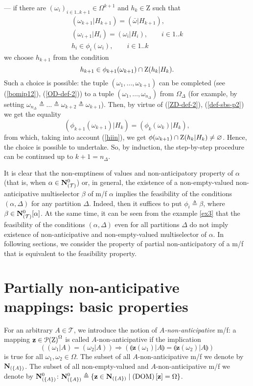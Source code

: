 \documentclass[sn-mathphys,Numbered,pdflatex]{sn-jnl}%
\theoremstyle{thmstyleone}%
\theoremstyle{thmstyletwo}%
\theoremstyle{thmstylethree}%
\newcommand{\nint}[2]{{{#1}..{#2}}}%
\newcommand{\mydef}{\mathrel{\triangleq}}%
\newcommand{\icP}[1]{\EuScript{P}({#1})}%
\newcommand{\res}[2]{\ensuremath{(#1|#2)}}%
\newcommand{\myimp}{\ensuremath{\mathrel{\Rightarrow}}}%
\newcommand{\naOm}{\ensuremath{\Omega}}%
\newcommand{\naZ}{\ensuremath{\mathrm{Z}}}%
\newcommand{\naZo}[2]{\naZ\setbox0=\hbox{\text{$#1$}}\ifdim\wd0=0pt\else\res{#1}{#2}\fi}%
\newcommand{\naTc}{\ensuremath{\mathcal{T}}}%
\newcommand{\naN}{\AnaN{\naTc}{}}%
\newcommand{\AnaN}[2]{\mathbf{N}_{(#1)}\setbox0=\hbox{\text{$#2$}}\ifdim\wd0=0pt\else\left[{#2}\right]\fi}%
\newcommand{\AnaNO}[2]{\mathbf{N}^0_{(#1)}\setbox0=\hbox{\text{$#2$}}\ifdim\wd0=0pt\else\left[{#2}\right]\fi}%
\newcommand{\nado}[1]{(\mathrm{DOM})\setbox0=\hbox{\text{$#1$}}\ifdim\wd0=0pt\else\left[{#1}\right]\fi}%
\newcommand{\naNO}[1]{\naN^0\setbox0=\hbox{\text{$#1$}}\ifdim\wd0=0pt\else[{#1}]\fi}%
\newcommand{\sres}[2]{\llparenthesis#1|#2\rrparenthesis}%
\newcommand{\fref}[1]{{\rm(\ref{#1})}}   %
\begin{document}
--- if there are $(\omega_i)_{i\in\nint1{k+1}}\in\naOm^{k+1}$ and $h_k\in\naZ$ such that
\begin{gather}
\res{\omega_{k+1}}{H_{k+1}}=\res{\bar\omega}{H_{k+1}} ,\label{bomip1}\\
\res{\omega_{i+1}}{H_{i}}=\res{\omega_i}{H_{i}},\qquad i\in\nint1k\label{bomip12}\\
h_i\in\phi_i(\omega_i),\qquad i\in\nint1k\label{hiin}
\end{gather}
we choose $h_{k+1}$ from the condition
$$
h_{k+1}\in\phi_{k+1}(\omega_{k+1})\cap\naZo{h_k}{H_k}.
$$
Such a choice is possible: the tuple $(\omega_1,\ldots,\omega_{k+1})$ can be completed (see \fref{bomip12}, \fref{OD-def-2}) to a tuple $(\omega_1,\ldots,\omega_{n_\Delta})$ from $\naOm_\Delta$ (for example, by setting $\omega_{n_\Delta} \mydef \ldots \mydef \omega_{k+2} \mydef \omega_{k+1}$).
Then, by virtue of \fref{ZD-def-2}, \fref{def-sbs-p2} we get the equality
$$
\res{\phi_{k+1}(\omega_{k+1})}{H_{k}}=\res{\phi_{k}(\omega_{k})}{H_{k}},
$$
from which, taking into account \fref{hiin}, we get $\phi(\omega_{k+1})\cap\naZo{h_k}{H_k}\neq\varnothing$.
Hence, the choice is possible to undertake.
So, by induction, the step-by-step procedure can be continued up to $k+1=n_\Delta$.

It is clear that the non-emptiness of values and non-anticipatory property of $\alpha$ (that is, when $\alpha\in\naNO{}$) or, in general, the existence of a non-empty-valued non-anticipative multiselector $\beta$ of m/f $\alpha$ implies the feasibility of the conditions $(\alpha, \Delta)$ for any partition $\Delta$.
Indeed, then it suffices to put $\phi_i\mydef\beta$, where $\beta\in\naNO\alpha$.
At the same time, it can be seen from the example \ref{ex3} that the feasibility of the conditions $(\alpha, \Delta)$ even for all partitions $\Delta$ do not imply existence of non-anticipative and non-empty-valued multiselector of $\alpha$.
In following sections, we consider the property of partial non-anticipatory of a m/f that is equivalent to the feasibility property.


\section{Partially non-anticipative mappings: basic properties}
\label{Ana}

For an arbitrary $A\in\naTc$, we introduce the notion of \emph{$A$-non-anticipative} m/f:
a mapping $\mathbf{z}\in{\icP\naZ}^\naOm$ is called $A$-non-anticipative if the implication
$$
\left(\res{\omega_1}{A}=\res{\omega_2}{A}\right) \myimp \left(\sres{\mathbf{z}(\omega_1)}{A}=\sres{\mathbf{z}(\omega_2)}{A}\right)
$$
is true for all $\omega_1,\omega_2\in\naOm$.
The subset of all $A$-non-anticipative m/f we denote by $\AnaN{\{A\}}{}$.
The subset of all non-empty-valued and $A$-non-anticipative m/f we denote by $\AnaNO{\{A\}}{}$:
$\AnaNO{\{A\}}{ }\mydef\{{\bf z}\in\AnaN{\{A\}}{}\mid \nado{\bf z}=\naOm\}$.
\end{document}
